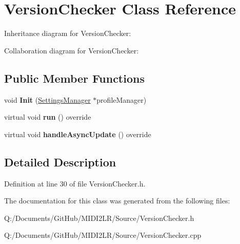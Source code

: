 \hypertarget{class_version_checker}{}\section{Version\+Checker Class Reference}
\label{class_version_checker}


Inheritance diagram for Version\+Checker\+:


Collaboration diagram for Version\+Checker\+:
\subsection*{Public Member Functions}
\begin{DoxyCompactItemize}
\item 
void {\bfseries Init} (\hyperlink{class_settings_manager}{Settings\+Manager} $\ast$profile\+Manager)\hypertarget{class_version_checker_ac8f448cf1ee019da5b84e3ce7e0a52bd}{}\label{class_version_checker_ac8f448cf1ee019da5b84e3ce7e0a52bd}

\item 
virtual void {\bfseries run} () override\hypertarget{class_version_checker_a04beca4aadd6a6df974c1c07f5113f7b}{}\label{class_version_checker_a04beca4aadd6a6df974c1c07f5113f7b}

\item 
virtual void {\bfseries handle\+Async\+Update} () override\hypertarget{class_version_checker_a3be0b90040969fec02cc547f7012accc}{}\label{class_version_checker_a3be0b90040969fec02cc547f7012accc}

\end{DoxyCompactItemize}


\subsection{Detailed Description}


Definition at line 30 of file Version\+Checker.\+h.



The documentation for this class was generated from the following files\+:\begin{DoxyCompactItemize}
\item 
Q\+:/\+Documents/\+Git\+Hub/\+M\+I\+D\+I2\+L\+R/\+Source/Version\+Checker.\+h\item 
Q\+:/\+Documents/\+Git\+Hub/\+M\+I\+D\+I2\+L\+R/\+Source/Version\+Checker.\+cpp\end{DoxyCompactItemize}
